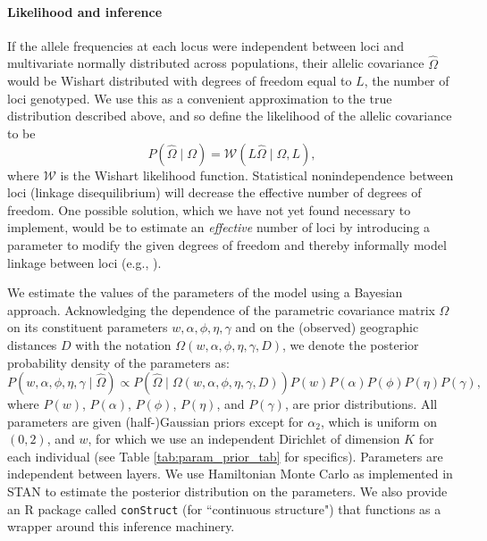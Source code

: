 \documentclass[10pt,letterpaper]{article}
\begin{document}
\paragraph{Likelihood and inference}
If the allele frequencies at each locus
were independent between loci and multivariate normally distributed across populations, 
their allelic covariance $\widehat{\Omega}$ 
would be Wishart distributed with degrees of freedom equal to $L$, 
the number of loci genotyped.
We use this as a convenient approximation to the true distribution described above,
and so define the likelihood of the allelic covariance to be
\begin{equation}
    P(\widehat{\Omega} \; | \; \Omega) 
    = 
    \mathcal{W} \left( L\widehat{\Omega} \; | \; \Omega,L\right) ,
\end{equation}
where $\mathcal{W}$ is the Wishart likelihood function.
Statistical nonindependence between loci (linkage disequilibrium)
will decrease the effective
number of degrees of freedom.  
One possible solution, which we have not yet found necessary to implement,
would be to estimate an \emph{effective} number of loci 
by introducing a parameter to modify the given degrees of freedom 
and thereby informally model linkage between loci (e.g., \cite{EEMS}).

We estimate the values of the parameters of the model using a Bayesian approach.
Acknowledging the dependence of the parametric covariance matrix $\Omega$ on its constituent parameters
$w,\alpha,\phi,\eta,\gamma$ and on the (observed) geographic distances $D$ 
with the notation $\Omega(w,\alpha,\phi,\eta,\gamma,D)$,
we denote the posterior probability density of the parameters as:
\begin{equation}
P\left( w,\alpha,\phi,\eta,\gamma \;|\; \widehat{\Omega} \right) 
    \propto
    P\left(\widehat{\Omega} \; | \; \Omega(w,\alpha,\phi,\eta,\gamma,D) \right)
    P(w)P(\alpha)P(\phi)P(\eta)P(\gamma) ,
\end{equation}
where $P(w)$, $P(\alpha)$, $P(\phi)$, $P(\eta)$, and $P(\gamma)$, are prior distributions.
All parameters are given (half-)Gaussian priors 
except for $\alpha_2$, which is uniform on $(0,2)$, 
and $w$, for which we use an independent Dirichlet of dimension $K$ for each individual
(see Table \ref{tab:param_prior_tab} for specifics).
Parameters are independent between layers.
We use Hamiltonian Monte Carlo as implemented in STAN \cite{stan, NUTS, stan_lib, rstan} 
to estimate the posterior distribution on the parameters.
We also provide an R package \cite{R} called \texttt{conStruct} 
(for ``continuous structure") that functions as a wrapper around this inference machinery.
\end{document}
